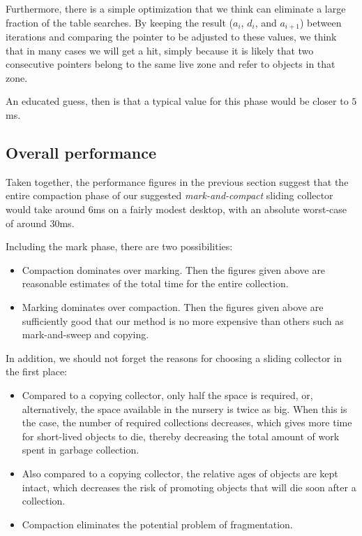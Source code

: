 Furthermore, there is a simple optimization that we think can
eliminate a large fraction of the table searches.  By keeping the
result ($a_i$, $d_i$, and $a_{i+1}$) between iterations and comparing
the pointer to be adjusted to these values, we think that in many
cases we will get a hit, simply because it is likely that two
consecutive pointers belong to the same live zone and refer to objects
in that zone.  

An educated guess, then is that a typical value for this phase would
be closer to $5$ms. 

\subsection{Overall performance}

Taken together, the performance figures in the previous section
suggest that the entire compaction phase of our suggested
\emph{mark-and-compact} sliding collector would take around $6$ms on a
fairly modest desktop, with an absolute worst-case of around $30$ms.

Including the mark phase, there are two possibilities:

\begin{itemize}
\item Compaction dominates over marking.  Then the figures given above
  are reasonable estimates of the total time for the entire
  collection.
\item Marking dominates over compaction.  Then the figures given above
  are sufficiently good that our method is no more expensive than
  others such as mark-and-sweep and copying. 
\end{itemize}

In addition, we should not forget the reasons for choosing a
sliding collector in the first place:

\begin{itemize}
\item Compared to a copying collector, only half the space is
  required, or, alternatively, the space available in the nursery is
  twice as big.  When this is the case, the number of required
  collections decreases, which gives more time for short-lived objects
  to die, thereby decreasing the total amount of work spent in garbage
  collection. 
\item Also compared to a copying collector, the relative ages of
  objects are kept intact, which decreases the risk of promoting
  objects that will die soon after a collection. 
\item Compaction eliminates the potential problem of fragmentation. 
\end{itemize}

